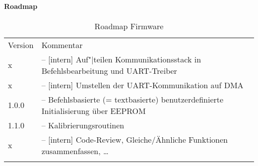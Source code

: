 \paragraph{Roadmap}


\begin{table}[htbp]%
	\centering
	\caption{Roadmap Firmware}
	\label{tab:repo:fw_roadmap}
	\begin{tabular}{lp{10cm}}
		\mytoprule
		Version & Kommentar \\
		\mymidrule
		x
			& -- [intern] Auf"|teilen Kommunikationsstack in Befehlsbearbeitung und UART-Treiber \\
		x
			& -- [intern] Umstellen der UART-Kommunikation auf DMA \\
		1.0.0
			& -- Befehlsbasierte (= textbasierte) benutzerdefinierte Initialisierung über EEPROM \\
		1.1.0
			& -- Kalibrierungsroutinen \\
		x
			& -- [intern] Code-Review, Gleiche/Ähnliche Funktionen zusammenfassen, \ldots \\
		\mybottomrule
	\end{tabular}
\end{table}
